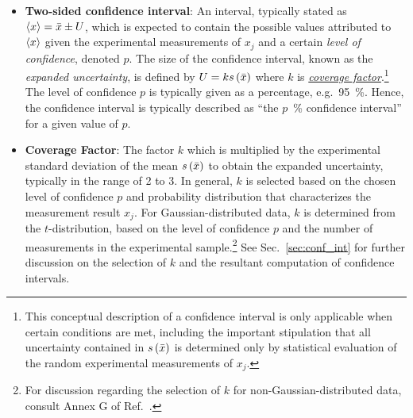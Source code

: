 \begin{itemize}
\item {\bf Two-sided confidence interval}: An interval, typically stated as $\langle x \rangle = \bar{x} \pm U$, which is expected to contain the possible values attributed to $\langle x \rangle$ given the experimental measurements of $x_j$ and a certain {\it level of confidence}, denoted $p$.
  The size of the confidence interval, known as the {\it expanded uncertainty}, is defined by $U = k s\left( \bar{x} \right)$ where $k$ is \hyperref[def:coveragefactor]{\it coverage factor}\cite{JCGM:VIM2012}.\footnote{This conceptual description of a confidence interval is only applicable when certain conditions are met, including the important stipulation that all uncertainty contained in $s\left( \bar{x} \right)$ is determined only by statistical evaluation of the random experimental measurements of $x_j$\cite{JCGM:GUM2008}.}
  The level of confidence $p$ is typically given as a percentage, e.g.~95~\%. Hence, the confidence interval is typically described as ``the $p$~\% confidence interval'' for a given value of $p$.
  \label{def:conf_int}

\item {\bf Coverage Factor}:
  The factor $k$ which is multiplied by the experimental standard deviation of the mean \hyperref[def:exp_st_dev_mean]{$s\left( \bar{x} \right)$} to obtain the expanded uncertainty, typically in the range of 2 to 3. In general, $k$ is selected based on the chosen level of confidence $p$ and probability distribution that characterizes the measurement result $x_j$. For Gaussian-distributed data, $k$ is determined from the $t$-distribution, based on the level of confidence $p$ and the number of measurements in the experimental sample.\footnote{For discussion regarding the selection of $k$ for non-Gaussian-distributed data, consult Annex G of Ref.~\cite{JCGM:GUM2008}.} See Sec.~\ref{sec:conf_int} for further discussion on the selection of $k$ and the resultant computation of confidence intervals.
  \label{def:coveragefactor}
  
\end{itemize}

